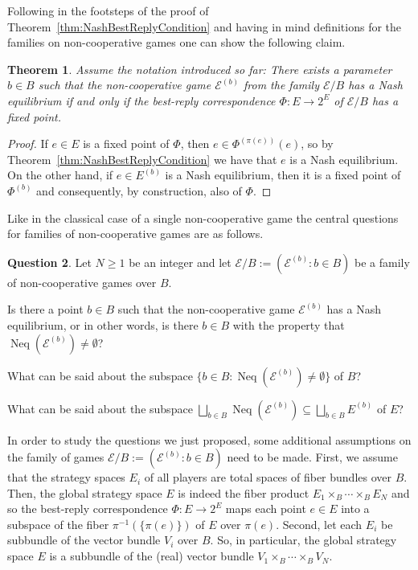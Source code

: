 \documentclass[a4paper,11pt,reqno,english]{amsart}
\theoremstyle{plain}
\newtheorem{theorem}{Theorem}[section]
\theoremstyle{definition}
\newtheorem{question}[theorem]{Question}
\newcommand{\Ecal}{\mathcal{E}}
\DeclareMathOperator{\NashEquilibria}{Neq}
\begin{document}
\medskip
Following in the footsteps of the proof of Theorem~\ref{thm:NashBestReplyCondition} and having in mind definitions for the families on non-cooperative games one can show the following claim.

\begin{theorem}\label{thm:FiberwiseBestReplyCondition}
	Assume the notation introduced so far: There exists a parameter $b\in B$ such that the non-cooperative game $\Ecal^{(b)}$ from the family $\Ecal/B$ has a Nash equilibrium if and only if the best-reply correspondence $\Phi \colon E \longrightarrow 2^{E}$ of $\Ecal/B$  has a fixed point.
\end{theorem}
\begin{proof}
	If $e\in E$ is a fixed point of $\Phi$, then  $e\in\Phi^{(\pi(e))}(e)$, so by Theorem~\ref{thm:NashBestReplyCondition} we have that $e$ is a Nash equilibrium.
	On the other hand, if  $e\in E^{(b)}$ is a Nash equilibrium, then it is a fixed point of $\Phi^{(b)}$ and consequently, by construction, also of $\Phi$.
\end{proof}


\medskip
Like in the classical case of a single non-cooperative game the central questions for families of non-cooperative games are as follows.

\begin{question}
	Let $N\geq 1$ be an integer and let $\Ecal/B:=(\Ecal^{(b)}:b\in B)$ be a family of non-cooperative games over $B$.
	\begin{compactenum}[\rm \quad (A)]
		\item Is there a point $b\in B$ such that the non-cooperative game $\Ecal^{(b)}$ has a Nash equilibrium, or in other words, is there $b\in B$ with the property that $\NashEquilibria (\Ecal^{(b)})\neq\emptyset$?
		\item What can be said about the subspace $\{b\in B : \NashEquilibria (\Ecal^{(b)})\neq\emptyset\}$ of $B$?
		\item What can be said about the subspace  $\bigsqcup_{b\in B}\NashEquilibria (\Ecal^{(b)})\subseteq \bigsqcup_{b\in B}E^{(b)}$ of $E$?
	\end{compactenum}
\end{question}

 

\medskip
In order to study the questions we just proposed, some additional assumptions on the family of games $\Ecal/B:=(\Ecal^{(b)}:b\in B)$ need to be made.
First, we assume that the strategy spaces $E_i$ of all players are total spaces of fiber bundles over $B$.
Then, the global strategy space $E$ is indeed the fiber product $E_1\times_B\cdots\times_B E_N$ and so the best-reply correspondence $\Phi \colon E \longrightarrow 2^{E}$ maps each point $e\in E$ into a subspace of the fiber $\pi^{-1}(\{\pi(e)\})$ of $E$ over $\pi(e)$.
Second, let each $E_i$ be subbundle of the vector bundle $V_i$ over $B$.
So, in particular, the global strategy space $E$ is a subbundle of the (real) vector bundle $V_1\times_B\cdots\times_B V_N$.
\end{document}
